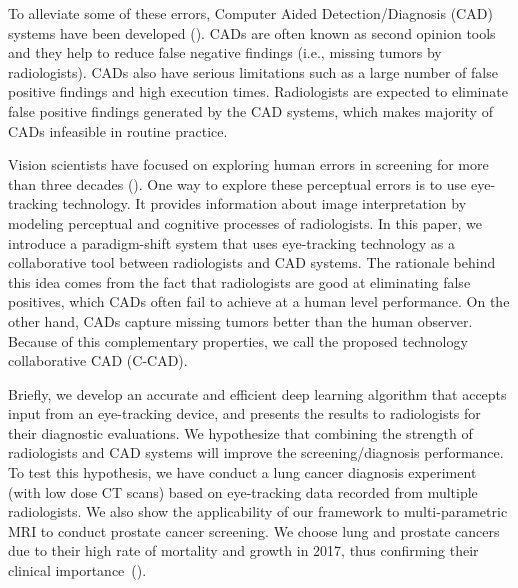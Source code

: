 \documentclass[preprint,12pt]{elsarticle}
\begin{document}
To alleviate some of these errors, Computer Aided Detection/Diagnosis (CAD) systems have been developed (\cite{firmino2014computer,lemaitre2015computer,jalalian2013computer}). CADs are often known as second opinion tools and they help to reduce false negative findings (i.e., missing tumors by radiologists). CADs also have serious limitations such as a large number of false positive findings and high execution times. Radiologists are expected to eliminate false positive findings generated by the CAD systems, which makes majority of CADs infeasible in routine practice.

% 
% 
% 

Vision scientists have focused on exploring human errors in screening for more than three decades (\cite{kundel1978visual,lee2013cognitive,mccreadie2009eight,al2017eye,kok2017before,venjakob2015visual,drew2013informatics,manning2006radiologists,littlefair2017does,tourassi2013investigating}). One way to explore these perceptual errors is to use eye-tracking technology. It provides information about image interpretation by modeling perceptual and cognitive processes of radiologists. In this paper, we introduce a paradigm-shift system that uses eye-tracking technology as a collaborative tool between radiologists and CAD systems. The rationale behind this idea comes from the fact that radiologists are good at eliminating false positives, which CADs often fail to achieve at a human level performance. On the other hand, CADs capture missing tumors better than the human observer. Because of this complementary properties, we call the proposed technology collaborative CAD (C-CAD). 

Briefly, we develop an accurate and efficient deep learning algorithm that accepts input from an eye-tracking device, and presents the results to radiologists for their diagnostic evaluations. We hypothesize that combining the strength of radiologists and CAD systems will improve the screening/diagnosis performance. To test this hypothesis, we have conduct a lung cancer diagnosis experiment (with low dose CT scans) based on eye-tracking data recorded from multiple radiologists. We also show the applicability of our framework to multi-parametric MRI to conduct prostate cancer screening. We choose lung and prostate cancers due to their high rate of mortality and growth in 2017, thus confirming their clinical importance~(\cite{CAAC:CAAC21387}). 
\end{document}

